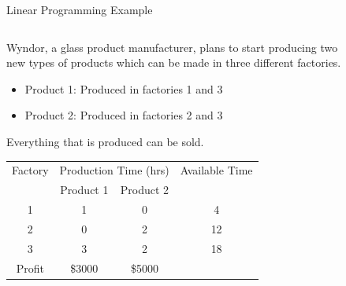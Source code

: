 \documentclass[
    NAME={Dr. Helga Ingimundardóttir},
    EMAIL={helgaingim@hi.is},
    FACULTY={Industrial Engineering},
    TITLE={Mixed Integer Programming},
    SUBTITLE={Techniques and Applications},
    SEMINAR={VÉL113F},
    DATE={Design and Optimization},
    WIDE=true
]{../HI-latex/hi-beamer}
\begin{document}
    \begin{frame}{Linear Programming Example}
        \begin{columns}
            \begin{column}{0.5\textwidth}
                \begin{example}
                {\small
                Wyndor, a glass product manufacturer, plans to start producing two new types of products which can be made in three different factories.
                    \begin{itemize}
                        \item Product 1: Produced in factories 1 and 3
                        \item Product 2: Produced in factories 2 and 3
                    \end{itemize}

                    Everything that is produced can be sold.}
                {\centering \footnotesize
                    \begin{tabular}{|cccc|}
                        \hline
                        Factory & \multicolumn{2}{c}{Production Time (hrs)} & Available Time \\
                        & Product 1 & Product 2 &    \\
                        \hline
                        1      & 1         & 0         & 4  \\
                        2      & 0         & 2         & 12 \\
                        3      & 3         & 2         & 18 \\
                        \hline
                        Profit & \$3000    & \$5000    &    \\
                        \hline
                    \end{tabular}
                }
                \end{example}

            \end{column}
            \begin{column}{0.5\textwidth}
                \begin{figure}

\end{figure}
\end{column}
\end{columns}
\end{frame}
\end{document}
